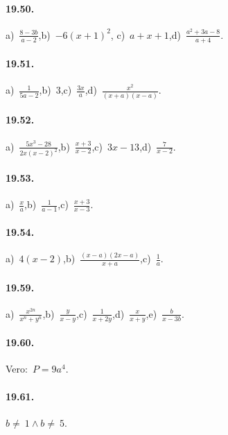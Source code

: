 \paragraph{19.50.}
a)~$\frac{8-3b}{a-2}$,\quad b)~$-6(x+1)^{2}$, \quad c)~$a+x+1$,\quad d)~$\frac{a^{2}+3a-8}{a+4}$.

\paragraph{19.51.}
a)~$\frac{1}{5a-2}$,\quad b)~$3$,\quad c)~$\frac{3x}{a}$,\quad d)~$\frac{x^{2}}{(x+a)(x-a)}$.

\paragraph{19.52.}
a)~$\frac{5x^{3}-28}{2x(x-2)^{2}}$,\quad b)~$\frac{x+3}{x-2}$,\quad c)~$3x-13$,\quad d)~$\frac{7}{x-2}$.

\paragraph{19.53.}
a)~$\frac{x}{a}$,\quad b)~$\frac{1}{a-1}$,\quad c)~$\frac{x+3}{x-3}$.

\paragraph{19.54.}
a)~$4(x-2)$,\quad b)~$\frac{(x-a)(2x-a)}{x+a}$,\quad c)~$\frac{1}{a}$.

\paragraph{19.59.}
a)~$\frac{x^{2n}}{x^{n}+y^{n}}$,\quad b)~$\frac{y}{x-y}$,\quad c)~$\frac{1}{x+2y}$,\quad d)~$\frac{x}{x+y}$,\quad e)~$\frac{b}{x-3b}$.

\paragraph{19.60.}Vero:~$P=9a^{4}$.

\paragraph{19.61.}$b\neq~1\wedge b\neq~5$.
